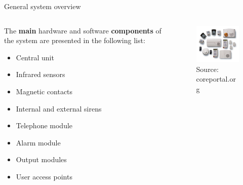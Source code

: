 \begin{frame}{General system overview}

  \begin{columns}
   \begin{column}{.50\textwidth}
      The {\textcolor{green!40!black}{\fontsize{13}{15}\textbf{main}}}
       hardware and software
       {\textcolor{green!40!black}{\fontsize{13}{15}\textbf{components}}}
        of the system are presented
      in the following list:
      \begin{itemize}
        \item Central unit
        \item Infrared sensors
        \item Magnetic contacts
        \item Internal and external sirens
        \item Telephone module
        \item Alarm module
        \item Output modules
        \item User access points
      \end{itemize}
   \end{column}

   \begin{column}{.50\textwidth}
   \vskip 0.3cm
   \begin{center}
      \begin{figure}[ht!]
        \centering
        \includegraphics[width=60mm]{images/alarm_systems.jpg}
        \caption{Source: coreportal.org}
      \end{figure}
   \end{center}
   \end{column}
 \end{columns}

\end{frame}


